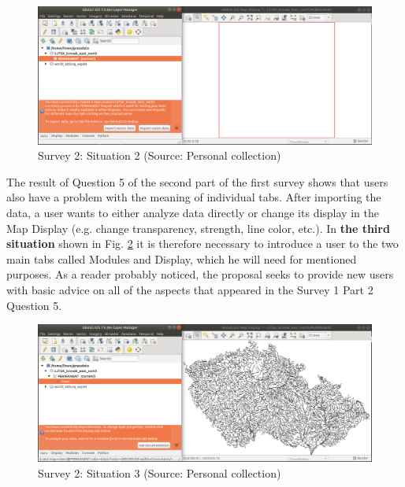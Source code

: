 \documentclass[a4paper,10pt,twoside]{article}
\begin{document}
\vspace{0.3cm}
\begin{figure}[hbt!] 
\begin{center}
\includegraphics[width=17cm]{../pictures/grass_infobar_2.png} 
\caption[Survey 2: Situation 2]{Survey 2: Situation 2 (Source: Personal collection)}
\label{fig:grass_infobar_2}
\end{center}
\end{figure}

\noindent The result of Question 5 of the second part of the first survey shows that users also have a problem with the meaning of individual tabs. After importing the data, a user wants to either analyze data directly or change its display in the Map Display (e.g. change transparency, strength, line color, etc.). In \textbf{the third situation} shown in Fig. \ref{fig:grass_infobar_3} it is therefore necessary to introduce a user to the two main tabs called Modules and Display, which he will need for mentioned purposes. As a reader probably noticed, the proposal seeks to provide new users with basic advice on all of the aspects that appeared in the Survey 1 Part 2 Question 5.

\vspace{0.3cm}
\begin{figure}[hbt!] 
\begin{center}
\includegraphics[width=17cm]{../pictures/grass_infobar_3.png} 
\caption[Survey 2: Situation 3]{Survey 2: Situation 3 (Source: Personal collection)}
\label{fig:grass_infobar_3}
\end{center}
\end{figure}
\end{document}
